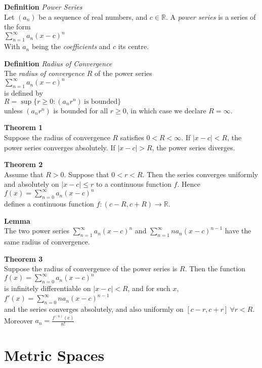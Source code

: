 \documentclass[8pt,landscape]{article}
\begin{document}
\begin{multicols}{3}
\textbf{Definition} \emph{Power Series} \\
Let $(a_n)$ be a sequence of real numbers, and $c \in \mathbb{R}$.
A \emph{power series} is a series of the form \\
$\sum_{n=1}^\infty a_n{(x-c)}^n$ \\
With $a_n$ being the \emph{coefficients} and $c$ its centre.

\textbf{Definition} \emph{Radius of Convergence} \\
The \emph{radius of convergence} $R$ of the power series \\
$\sum_{n=1}^\infty a_n{(x-c)}^n$ \\
is defined by \\
$R = \sup \{ r \geq 0 : (a_n r^n) \ \text{is bounded} \}$ \\
unless $(a_n r^n)$ is bounded for all $r \geq 0$, in which case we declare
$R = \infty$.

\textbf{Theorem 1} \\
Suppose the radius of convergence $R$ satisfies $0 < R < \infty$.
If $|x - c| < R$, the power series converges absolutely.
If $|x - c| > R$, the power series diverges.

\textbf{Theorem 2} \\
Assume that $R > 0$.
Suppose that $0 < r < R$.
Then the series converges uniformly and absolutely on $|x-c| \leq r$ to a continuous
function $f$.
Hence \\
$f(x) = \sum_{n=0}^\infty a_n{(x-c)}^n$ \\
defines a continuous function $f : (c - R, c + R) \to \mathbb{R}$.

\textbf{Lemma} \\
The two power series $\sum_{n=1}^\infty a_n {(x-c)}^n$ and
$\sum_{n=1}^\infty n a_n {(x-c)}^{n-1}$ have the same radius of convergence.

\textbf{Theorem 3} \\
Suppose the radius of convergence of the power series is $R$.
Then the function \\
$f(x) = \sum_{n=0}^\infty a_n {(x-c)}^n$ \\
is infinitely differentiable on $|x-c| < R$, and for such $x$, \\
$f'(x) = \sum_{n=0}^\infty n a_n {(x-c)}^{n-1}$ \\
and the series converges absolutely, and also uniformly on $[c-r, c+r] \ \forall r<R$.
Moreover $a_n = \frac{f^{(n)}(c)}{n!}$

\section{Metric Spaces}


\end{multicols}
\end{document}
